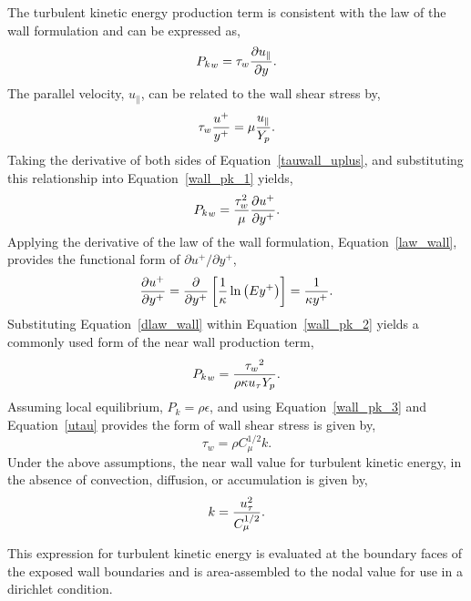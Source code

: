 The turbulent kinetic energy production term is consistent with the law of the wall formulation and can be expressed as,
%
\begin{equation}
        {P_k}_w = \tau_w {{\partial u_{\|}} \over {\partial y}}.
\label{wall_pk_1}
\end{equation}
%
The parallel velocity, $u_{\|}$, can be related to the wall shear stress by,
%
\begin{equation}
        \tau_w {u^+ \over y^+ } = \mu {u_{\|} \over Y_p }.
\label{tauwall_uplus}
\end{equation}
%
Taking the derivative of both sides of Equation~\ref{tauwall_uplus}, and
substituting this relationship into Equation~\ref{wall_pk_1} yields,
%
\begin{equation} 
        {P_k}_w = {\tau_w^2 \over \mu} {{\partial u^+} \over {\partial y^+}}.
\label{wall_pk_2}
\end{equation}
%
Applying the derivative of the law of the wall formulation, Equation~\ref{law_wall},
provides the functional form of ${\partial u^+ / \partial y^+}$,
%
\begin{equation} 
        {\partial u^+ \over \partial y^+}
      = {\partial \over \partial y^+}
       \left[{ 1 \over \kappa } \ln \left(Ey^+\right) \right]
      = {1 \over \kappa y^+}.
\label{dlaw_wall}
\end{equation}
%
Substituting Equation~\ref{dlaw_wall} within Equation~\ref{wall_pk_2} yields
a commonly used form of the near wall production term,
%
\begin{equation}
        {P_k}_w = {{\tau_w}^2 \over \rho\kappa u_{\tau} Y_p}.
\label{wall_pk_3}
\end{equation}
%
Assuming local equilibrium, $P_k = \rho\epsilon$, and using
Equation~\ref{wall_pk_3} and Equation~\ref{utau} provides the form 
of wall shear stress is given by,
%
\begin{equation}
        \tau_w = \rho C_\mu^{1/2} k.
\label{wall_tauw_equil}
\end{equation}
%
Under the above assumptions, the near wall value for turbulent kinetic 
energy, in the absence of convection, diffusion, or accumulation is given by,
%
\begin{equation}
   k = {{u_\tau^2} \over {C_\mu^{1/2}}}.
\label{wall_tke}
\end{equation}

This expression for turbulent kinetic energy is evaluated at the boundary faces of the
exposed wall boundaries and is area-assembled to the nodal value for use in a dirichlet condition.

